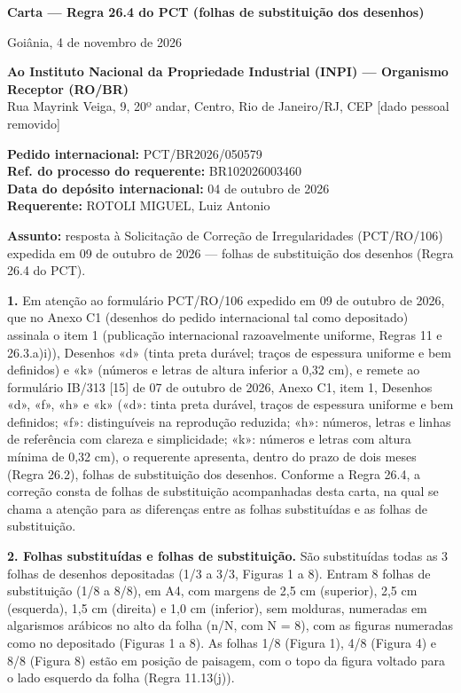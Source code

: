 \documentclass[a4paper,11pt]{article}
\begin{document}
\begin{center}{\large\bfseries Carta --- Regra 26.4 do PCT (folhas de substituição dos desenhos)}\end{center}

Goiânia, 4 de novembro de 2026

\textbf{Ao Instituto Nacional da Propriedade Industrial (INPI) --- Organismo Receptor (RO/BR)}\\ Rua Mayrink Veiga, 9, 20º andar, Centro, Rio de Janeiro/RJ, CEP [dado pessoal removido]

\textbf{Pedido internacional:} PCT/BR2026/050579\\ \textbf{Ref. do processo do requerente:} BR102026003460\\ \textbf{Data do depósito internacional:} 04 de outubro de 2026\\ \textbf{Requerente:} ROTOLI MIGUEL, Luiz Antonio

\textbf{Assunto:} resposta à Solicitação de Correção de Irregularidades (PCT/RO/106) expedida em 09 de outubro de 2026 --- folhas de substituição dos desenhos (Regra 26.4 do PCT).

\textbf{1.} Em atenção ao formulário PCT/RO/106 expedido em 09 de outubro de 2026, que no Anexo C1 (desenhos do pedido internacional tal como depositado) assinala o item 1 (publicação internacional razoavelmente uniforme, Regras 11 e 26.3.a)i)), Desenhos «d» (tinta preta durável; traços de espessura uniforme e bem definidos) e «k» (números e letras de altura inferior a 0,32 cm), e remete ao formulário IB/313 [15] de 07 de outubro de 2026, Anexo C1, item 1, Desenhos «d», «f», «h» e «k» («d»: tinta preta durável, traços de espessura uniforme e bem definidos; «f»: distinguíveis na reprodução reduzida; «h»: números, letras e linhas de referência com clareza e simplicidade; «k»: números e letras com altura mínima de 0,32 cm), o requerente apresenta, dentro do prazo de dois meses (Regra 26.2), folhas de substituição dos desenhos. Conforme a Regra 26.4, a correção consta de folhas de substituição acompanhadas desta carta, na qual se chama a atenção para as diferenças entre as folhas substituídas e as folhas de substituição.

\textbf{2. Folhas substituídas e folhas de substituição.} São substituídas todas as 3 folhas de desenhos depositadas (1/3 a 3/3, Figuras 1 a 8). Entram 8 folhas de substituição (1/8 a 8/8), em A4, com margens de 2,5 cm (superior), 2,5 cm (esquerda), 1,5 cm (direita) e 1,0 cm (inferior), sem molduras, numeradas em algarismos arábicos no alto da folha (n/N, com N = 8), com as figuras numeradas como no depositado (Figuras 1 a 8). As folhas 1/8 (Figura 1), 4/8 (Figura 4) e 8/8 (Figura 8) estão em posição de paisagem, com o topo da figura voltado para o lado esquerdo da folha (Regra 11.13(j)).
\end{document}
